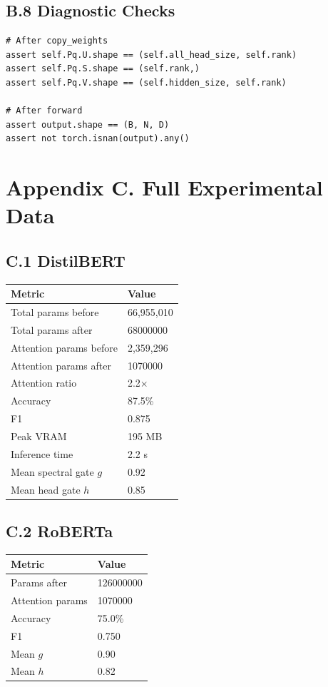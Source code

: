 \subsection{B.8 Diagnostic Checks}

\begin{lstlisting}
# After copy_weights
assert self.Pq.U.shape == (self.all_head_size, self.rank)
assert self.Pq.S.shape == (self.rank,)
assert self.Pq.V.shape == (self.hidden_size, self.rank)

# After forward
assert output.shape == (B, N, D)
assert not torch.isnan(output).any()
\end{lstlisting}



\section{Appendix C. Full Experimental Data}

\subsection{C.1 DistilBERT}

\begin{table}[H]
\centering
\small
\begin{tabular}{ll}
\toprule
\textbf{Metric} & \textbf{Value} \\
\midrule
Total params before & 66,955,010 \\
Total params after & 68000000 \\
Attention params before & 2,359,296 \\
Attention params after & 1070000 \\
Attention ratio & 2.2$\times$ \\
Accuracy & 87.5\% \\
F1 & 0.875 \\
Peak VRAM & 195 MB \\
Inference time & 2.2 s \\
Mean spectral gate $g$ & 0.92 \\
Mean head gate $h$ & 0.85 \\
\bottomrule
\end{tabular}
\end{table}

\subsection{C.2 RoBERTa}

\begin{table}[H]
\centering
\small
\begin{tabular}{ll}
\toprule
\textbf{Metric} & \textbf{Value} \\
\midrule
Params after & 126000000 \\
Attention params & 1070000 \\
Accuracy & 75.0\% \\
F1 & 0.750 \\
Mean $g$ & 0.90 \\
Mean $h$ & 0.82 \\
\bottomrule
\end{tabular}
\end{table}

